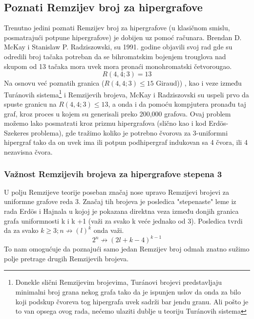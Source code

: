 \documentclass[a4paper]{article}
\begin{document}
	\subsection{Poznati Remzijev broj za hipergrafove}%
	Trenutno jedini poznati Remzijev broj za hipergrafove (u klasičnom smislu, posmatrajući potpune hipergrafove)\cite{pregled}%
	 je dobijen uz pomoć računara. Brendan D. McKay i Stanislaw P. Radziszowski, su 1991. godine objavili svoj rad \textcite{HGremzibroj} gde su odredili broj tačaka potreban da se bihromatskim bojenjem trouglova nad skupom od 13 tačaka mora uvek mora pronaći monohromatski četvorougao.%
	\begin{equation}
		R(4, 4; 3) = 13
	\end{equation}
	Na osnovu već poznatih granica ($R(4, 4; 3) \leq 15$ Giraud))%
	, kao i veze između Tur\'{a}novih sistema\footnote{Donekle slični Remzijevim brojevima, Tur\'{a}novi brojevi predstavljaju minimalni broj grana nekog grafa tako da je ispunjen uslov da onda za bilo koji podskup čvoreva tog hipergrafa uvek sadrži bar jendu granu. Ali pošto je to van opsega ovog rada, nećemo ulaziti dublje u teoriju Tur\'{a}novih sistema } i Remzijevih brojeva, McKay i Radziszovski su uspeli prvo da spuste granicu na $R(4, 4; 3) \leq 13$, a onda i da pomoću kompjutera pronađu taj graf, kroz proces u kojem su generisali preko 200,000 grafova. Ovaj problem možemo lako posmatrati kroz prizmu hipergrafova (slično kao i kod Erd\"{o}s-Szekeres problema), gde tražimo koliko je potrebno čvorova za 3-uniformni hipergraf tako da on uvek ima ili potpun podhipergraf indukovan sa 4 čvora, ili 4  nezavisna čvora. %
	\subsubsection{Važnost Remzijevih brojeva za hipergrafove stepena 3}
	U polju Remzijeve teorije poseban značaj nose upravo Remzijevi brojevi za uniformne grafove reda 3. Značaj tih brojeva je posledica "stepenaste" leme iz rada Erd\"{o}s i Hajnala \cite{posledice3remzi} %
	 u kojoj je pokazana direktna veza između donjih granica grafa uniformnosti k i k +1 (važi za svako k veće jednako od 3). Posledica tvrdi da za svako $k \geq 3; n \not\rightarrow (l)^k$ onda važi. \cite{matoraknjigajedvanadjena}
	\begin{equation}
		2^n \not\rightarrow (2l + k - 4)^{k-1}
	\end{equation}
	To nam omogućuje da poznajući samo jedan Remzijev broj odmah znatno sužimo polje pretrage drugih Remzijevih brojeva.
\end{document}
